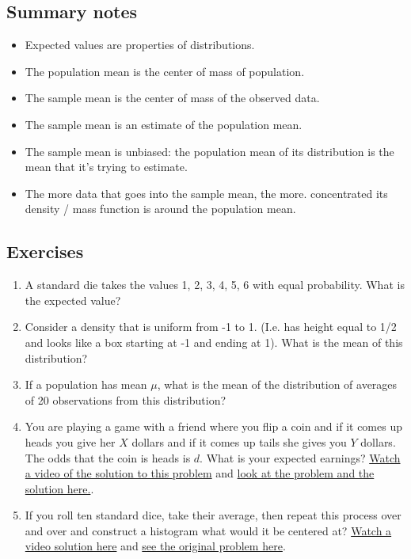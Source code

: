 \documentclass[]{article}
\begin{document}
\subsection{Summary notes}\label{summary-notes-1}

\begin{itemize}
\itemsep1pt\parskip0pt
\item
  Expected values are properties of distributions.
\item
  The population mean is the center of mass of population.
\item
  The sample mean is the center of mass of the observed data.
\item
  The sample mean is an estimate of the population mean.
\item
  The sample mean is unbiased: the population mean of its distribution
  is the mean that it's trying to estimate.
\item
  The more data that goes into the sample mean, the more. concentrated
  its density / mass function is around the population mean.
\end{itemize}

\subsection{Exercises}\label{exercises-3}

\begin{enumerate}
\def\labelenumi{\arabic{enumi}.}
\itemsep1pt\parskip0pt
\item
  A standard die takes the values 1, 2, 3, 4, 5, 6 with equal
  probability. What is the expected value?
\item
  Consider a density that is uniform from -1 to 1. (I.e. has height
  equal to 1/2 and looks like a box starting at -1 and ending at 1).
  What is the mean of this distribution?
\item
  If a population has mean $\mu$, what is the mean of the distribution
  of averages of 20 observations from this distribution?
\item
  You are playing a game with a friend where you flip a coin and if it
  comes up heads you give her $X$ dollars and if it comes up tails she
  gives you $Y$ dollars. The odds that the coin is heads is $d$. What is
  your expected earnings?
  \href{http://youtu.be/5J88Zq0q81o?list=PLpl-gQkQivXhHOcVeU3bSJg78zaDYbP9L}{Watch
  a video of the solution to this problem} and
  \href{http://bcaffo.github.io/courses/06_StatisticalInference/homework/hw1.html\#5}{look
  at the problem and the solution here.}.
\item
  If you roll ten standard dice, take their average, then repeat this
  process over and over and construct a histogram what would it be
  centered at?
  \href{https://www.youtube.com/watch?v=ia3n2URiJaw\&index=16\&list=PLpl-gQkQivXhHOcVeU3bSJg78zaDYbP9L}{Watch
  a video solution here} and
  \href{http://bcaffo.github.io/courses/06_StatisticalInference/homework/hw2.html\#11}{see
  the original problem here}.
\end{enumerate}
\end{document}
